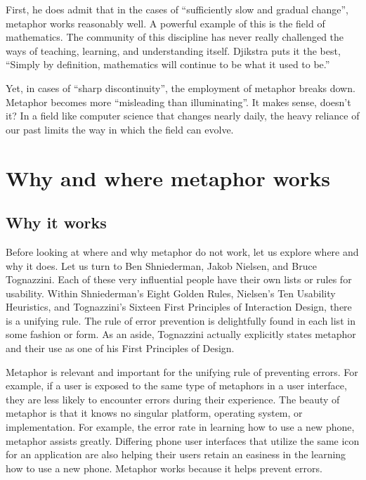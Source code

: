 \documentclass[11pt, oneside]{article}
\begin{document}
First, he does admit that in the cases of ``sufficiently slow and gradual change'', metaphor works reasonably well. A powerful example of this is the field of mathematics. The community of this discipline has never really challenged the ways of teaching, learning, and understanding itself. Djikstra puts it the best, ``Simply by definition, mathematics will continue to be what it used to be.''

Yet, in cases of ``sharp discontinuity'', the employment of metaphor breaks down. Metaphor becomes more ``misleading than illuminating''. It makes sense, doesn't it? In a field like computer science that changes nearly daily, the heavy reliance of our past limits the way in which the field can evolve.
\cite{ewd1036}

\section{Why and where metaphor works}
\subsection{Why it works}
Before looking at where and why metaphor do not work, let us explore where and why it does. Let us turn to Ben Shniederman, Jakob Nielsen, and Bruce Tognazzini. Each of these very influential people have their own lists or rules for usability. Within Shniederman's Eight Golden Rules, Nielsen's Ten Usability Heuristics, and Tognazzini's Sixteen First Principles of Interaction Design, there is a unifying rule. The rule of error prevention is delightfully found in each list in some fashion or form. \cite{shniederman-golden-rules, tognazzini-first-principles, nielsen-usability-heuristics} As an aside, Tognazzini actually explicitly states metaphor and their use as one of his First Principles of Design.

Metaphor is relevant and important for the unifying rule of preventing errors. For example, if a user is exposed to the same type of metaphors in a user interface, they are less likely to encounter errors during their experience. The beauty of metaphor is that it knows no singular platform, operating system, or implementation. For example, the error rate in learning how to use a new phone, metaphor assists greatly. Differing phone user interfaces that utilize the same icon for an application are also helping their users retain an easiness in the learning how to use a new phone. Metaphor works because it helps prevent errors.
\end{document}

